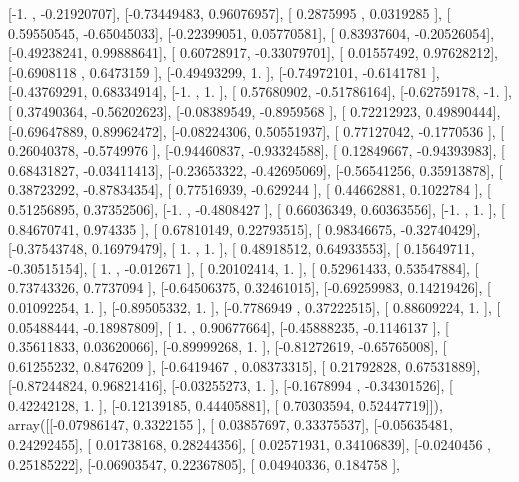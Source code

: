 \documentclass{article}
\begin{document}
       [-1.        , -0.21920707],
       [-0.73449483,  0.96076957],
       [ 0.2875995 ,  0.0319285 ],
       [ 0.59550545, -0.65045033],
       [-0.22399051,  0.05770581],
       [ 0.83937604, -0.20526054],
       [-0.49238241,  0.99888641],
       [ 0.60728917, -0.33079701],
       [ 0.01557492,  0.97628212],
       [-0.6908118 ,  0.6473159 ],
       [-0.49493299,  1.        ],
       [-0.74972101, -0.6141781 ],
       [-0.43769291,  0.68334914],
       [-1.        ,  1.        ],
       [ 0.57680902, -0.51786164],
       [-0.62759178, -1.        ],
       [ 0.37490364, -0.56202623],
       [-0.08389549, -0.8959568 ],
       [ 0.72212923,  0.49890444],
       [-0.69647889,  0.89962472],
       [-0.08224306,  0.50551937],
       [ 0.77127042, -0.1770536 ],
       [ 0.26040378, -0.5749976 ],
       [-0.94460837, -0.93324588],
       [ 0.12849667, -0.94393983],
       [ 0.68431827, -0.03411413],
       [-0.23653322, -0.42695069],
       [-0.56541256,  0.35913878],
       [ 0.38723292, -0.87834354],
       [ 0.77516939, -0.629244  ],
       [ 0.44662881,  0.1022784 ],
       [ 0.51256895,  0.37352506],
       [-1.        , -0.4808427 ],
       [ 0.66036349,  0.60363556],
       [-1.        ,  1.        ],
       [ 0.84670741,  0.974335  ],
       [ 0.67810149,  0.22793515],
       [ 0.98346675, -0.32740429],
       [-0.37543748,  0.16979479],
       [ 1.        ,  1.        ],
       [ 0.48918512,  0.64933553],
       [ 0.15649711, -0.30515154],
       [ 1.        , -0.012671  ],
       [ 0.20102414,  1.        ],
       [ 0.52961433,  0.53547884],
       [ 0.73743326,  0.7737094 ],
       [-0.64506375,  0.32461015],
       [-0.69259983,  0.14219426],
       [ 0.01092254,  1.        ],
       [-0.89505332,  1.        ],
       [-0.7786949 ,  0.37222515],
       [ 0.88609224,  1.        ],
       [ 0.05488444, -0.18987809],
       [ 1.        ,  0.90677664],
       [-0.45888235, -0.1146137 ],
       [ 0.35611833,  0.03620066],
       [-0.89999268,  1.        ],
       [-0.81272619, -0.65765008],
       [ 0.61255232,  0.8476209 ],
       [-0.6419467 ,  0.08373315],
       [ 0.21792828,  0.67531889],
       [-0.87244824,  0.96821416],
       [-0.03255273,  1.        ],
       [-0.1678994 , -0.34301526],
       [ 0.42242128,  1.        ],
       [-0.12139185,  0.44405881],
       [ 0.70303594,  0.52447719]]), array([[-0.07986147,  0.3322155 ],
       [ 0.03857697,  0.33375537],
       [-0.05635481,  0.24292455],
       [ 0.01738168,  0.28244356],
       [ 0.02571931,  0.34106839],
       [-0.0240456 ,  0.25185222],
       [-0.06903547,  0.22367805],
       [ 0.04940336,  0.184758  ],
\end{document}
